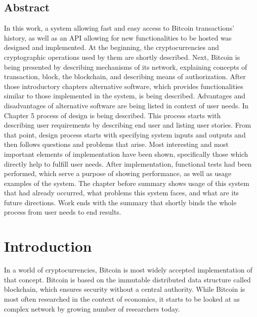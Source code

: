 \documentclass[12pt, en, eng, oneside, final]{mgr}
\begin{document}
\section*{Abstract}

In this work, a system allowing fast and easy access to Bitcoin transactions' history, as well as an API allowing for new functionalities to be hosted was designed and implemented. At the beginning, the cryptocurrencies and cryptographic operations used by them are shortly described. Next, Bitcoin is being presented by describing mechanisms of its network, explaining concepts of transaction, block, the blockchain, and describing means of authorization. After those introductory chapters alternative software, which provides functionalities similar to those implemented in the system, is being described. Advantages and disadvantages of alternative software are being listed in context of user needs. In Chapter 5 process of design is being described. This process starts with describing user requirements by describing end user and listing user stories. From that point, design process starts with specifying system inputs and outputs and then follows questions and problems that arise. Most interesting and most important elements of implementation have been shown, specifically those which directly help to fulfill user needs. After implementation, functional tests had been performed, which serve a purpose of showing performance, as well as usage examples of the system. The chapter before summary shows usage of this system that had already occurred, what problems this system faces, and what are its future directions. Work ends with the summary that shortly binds the whole process from user needs to end results.

\chapter{Introduction}

In a world of cryptocurrencies, Bitcoin is most widely accepted implementation of that concept. Bitcoin is based on the immutable distributed data structure called blockchain, which ensures security without a central authority. While Bitcoin is most often researched in the context of economics, it starts to be looked at as complex network by growing number of researchers today. 
\end{document}
